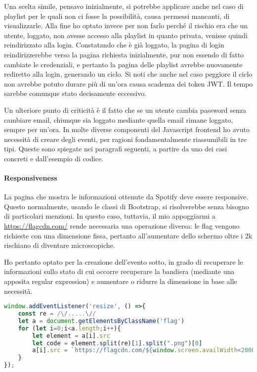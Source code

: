 Una scelta simile, pensavo inizialmente, si potrebbe applicare anche nel caso di playlist per le quali non ci fosse la possibilità, causa permessi mancanti, di visualizzarle. Alla fine ho optato invece per non farlo perché il rischio era che un utente, loggato, non avesse accesso alla playlist in quanto privata, venisse quindi reindirizzato alla login. Constatando che è già loggato, la pagina di login reindirizzerebbe verso la pagina richiesta inizialmente, pur non essendo di fatto cambiate le credenziali, e pertanto la pagina delle playlist avrebbe nuovamente rediretto alla login, generando un ciclo.
\alert{Si noti che anche nel caso peggiore il ciclo non avrebbe potuto durare più di un'ora causa scadenza dei token JWT. Il tempo sarebbe comunque stato decisamente eccessivo.}

\alert{Un ulteriore punto di criticità è il fatto che se un utente cambia password senza cambiare email, chiunque sia loggato mediante quella email rimane loggato, sempre per un'ora.}
In molte diverse componenti del Javascript frontend ho avuto necessità di creare degli eventi, per ragioni fondamentalmente riassumibili in tre tipi. Queste sono spiegate nei paragrafi seguenti, a partire da uno dei casi concreti e dall'esempio di codice.
\paragraph{Responsiveness} La pagina che mostra le informazioni ottenute da Spotify deve essere responsive. Questo normalmente, usando le classi di Bootstrap, si risolverebbe senza bisogno di particolari menzioni. In questo caso, tuttavia, il mio appoggiarmi a \href{https://flagcdn.com/}{\underline{https://flagcdn.com/}} rende necessaria una operazione diversa: le flag vengono richieste con una dimensione fissa, pertanto all'aumentare dello schermo oltre i 2k rischiano di diventare microscopiche.

Ho pertanto optato per la creazione dell'evento sotto, in grado di recuperare le informazioni sullo stato di cui occorre recuperare la bandiera (mediante una apposita regular expression) e aumentare o ridurre la dimensione in base alle necessità.
\begin{lstlisting}[language=JavaScript]
window.addEventListener('resize', () =>{
    const re = /\/.....\//
    let a = document.getElementsByClassName('flag')
    for (let i=0;i<a.length;i++){
        let element = a[i].src
        let code = element.split(re)[1].split(".png")[0]
        a[i].src = `https://flagcdn.com/${window.screen.availWidth<2000?"16x12":"64x48"}/${code}.png`
    }
});
\end{lstlisting}
